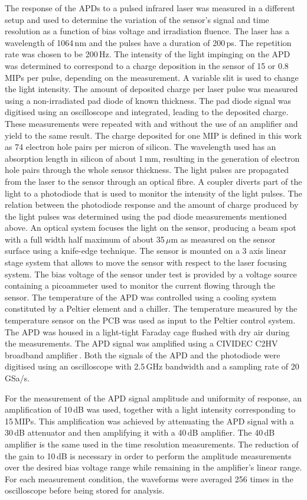 \documentclass[review,number,sort&compress]{elsarticle}
\begin{document}
The response of the APDs to a pulsed infrared laser was measured in a different setup and used to determine the variation of the sensor's signal and time resolution as a function of bias voltage and irradiation fluence.
The laser has a wavelength of 1064\,nm and the pulses have a duration of 200\,ps.
The repetition rate was chosen to be 200\,Hz.
The intensity of the light impinging on the APD was determined to correspond to a charge deposition in the sensor of 15 or 0.8\,MIPs per pulse, depending on the measurement.
A variable slit is used to change the light intensity.
The amount of deposited charge per laser pulse was measured using a non-irradiated pad diode of known thickness.
The pad diode signal was digitised using an oscilloscope and integrated, leading to the deposited charge.
These measurements were repeated with and without the use of an amplifier and yield to the same result.
The charge deposited for one MIP is defined in this work as 74 electron hole pairs per micron of silicon.
The wavelength used has an absorption length in silicon of about 1\,mm, resulting in the generation of electron hole pairs through the whole sensor thickness.
The light pulses are propagated from the laser to the sensor through an optical fibre.
A coupler diverts part of the light to a photodiode that is used to monitor the intensity of the light pulses.
The relation between the photodiode response and the amount of charge produced by the light pulses was determined using the pad diode measurements mentioned above.
An optical system focuses the light on the sensor, producing a beam spot with a full width half maximum of about 35\,$\mu$m as measured on the sensor surface using a knife-edge technique.
The sensor is mounted on a 3 axis linear stage system that allows to move the sensor with respect to the laser focusing system.
The bias voltage of the sensor under test is provided by a voltage source containing a picoammeter used to monitor the current flowing through the sensor.
The temperature of the APD was controlled using a cooling system constituted by a Peltier element and a chiller.
The temperature measured by the temperature sensor on the PCB was used as input to the Peltier control system.
The APD was housed in a light-tight Faraday cage flushed with dry air during the measurements.
The APD signal was amplified using a CIVIDEC C2HV broadband amplifier\,\cite{cividec}.
Both the signals of the APD and the photodiode were digitised using an oscilloscope with 2.5\,GHz bandwidth and a sampling rate of 20\,GSa/s.

For the measurement of the APD signal amplitude and uniformity of response, an amplification of 10\,dB was used, together with a light intensity corresponding to 15\,MIPs.
This amplification was achieved by attenuating the APD signal with a 30\,dB attenuator and then amplifying it with a 40\,dB amplifier.
The 40\,dB amplifier is the same used in the time resolution measurements.
The reduction of the gain to 10\,dB is necessary in order to perform the amplitude measurements over the desired bias voltage range while remaining in the amplifier's linear range.
For each measurement condition, the waveforms were averaged 256 times in the oscilloscope before being stored for analysis.
\end{document}
